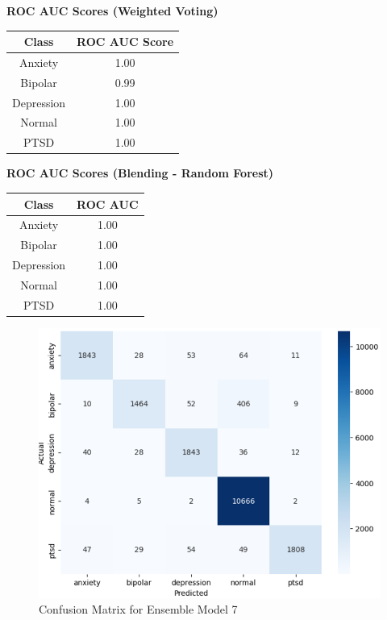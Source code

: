 \begin{center}
    \textbf{ROC AUC Scores (Weighted Voting)} \\[0.5em]
    \begin{tabular}{|c|c|}
        \hline
        \textbf{Class} & \textbf{ROC AUC Score} \\ \hline
        Anxiety & 1.00 \\ \hline
        Bipolar & 0.99 \\ \hline
        Depression & 1.00 \\ \hline
        Normal & 1.00 \\ \hline
        PTSD & 1.00 \\ \hline
    \end{tabular}
\end{center}

\begin{center}
    \textbf{ROC AUC Scores (Blending - Random Forest)} \\[0.5em]
    \begin{tabular}{|c|c|}
        \hline
        \textbf{Class} & \textbf{ROC AUC} \\ \hline
        Anxiety & 1.00 \\ \hline
        Bipolar & 1.00 \\ \hline
        Depression & 1.00 \\ \hline
        Normal & 1.00 \\ \hline
        PTSD & 1.00 \\ \hline
    \end{tabular}
\end{center}

\begin{figure}[h!]  
    \centering
    \includegraphics[width=1.0\textwidth]{Images/WV CM.png}  
    \caption{Confusion Matrix for Ensemble Model 7}
    \label{dfdl1244883}  %
\end{figure}

